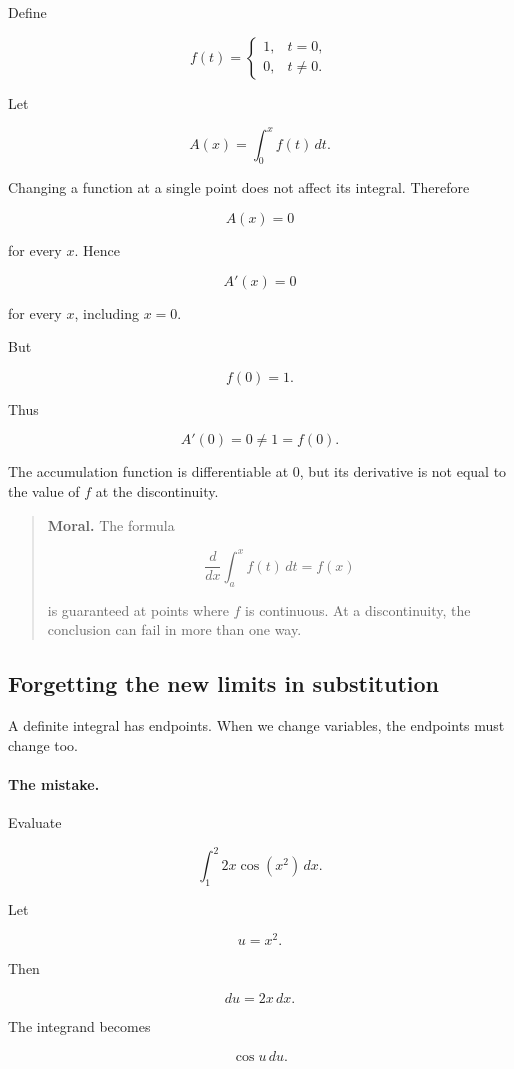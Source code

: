 Define

\[
f(t)=
\begin{cases}
1, & t=0,\\
0, & t\neq0.
\end{cases}
\]

Let

\[
A(x)=\int_0^x f(t)\,dt.
\]

Changing a function at a single point does not affect its integral.  Therefore

\[
A(x)=0
\]

for every \(x\).  Hence

\[
A'(x)=0
\]

for every \(x\), including \(x=0\).

But

\[
f(0)=1.
\]

Thus

\[
A'(0)=0\neq1=f(0).
\]

The accumulation function is differentiable at \(0\), but its derivative is not equal to
the value of \(f\) at the discontinuity.

\begin{quote}
\textbf{Moral.}
The formula

\[
\frac{d}{dx}\int_a^x f(t)\,dt=f(x)
\]

is guaranteed at points where \(f\) is continuous.  At a discontinuity, the conclusion
can fail in more than one way.
\end{quote}

\subsection{Forgetting the new limits in substitution}
\label{subsec:warning-new-limits-substitution}

A definite integral has endpoints.  When we change variables, the endpoints must
change too.

\paragraph{The mistake.}
Evaluate

\[
\int_1^2 2x\cos(x^2)\,dx.
\]

Let

\[
u=x^2.
\]

Then

\[
du=2x\,dx.
\]

The integrand becomes

\[
\cos u\,du.
\]

